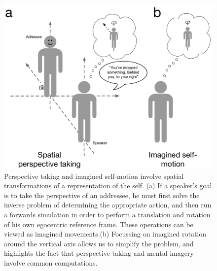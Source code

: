 \documentclass[english,floatsintext,man]{apa6}
\theoremstyle{definition}
\theoremstyle{definition}
\theoremstyle{remark}
\begin{document}
\begin{figure}
\centering
\includegraphics{diagrams/fig-1-common-process.pdf}
\caption{\label{fig:spt-schematic}Perspective taking and imagined
self-motion involve spatial transformations of a representation of the
self. (a) If a speaker's goal is to take the perspective of an
addressee, he must first solve the inverse problem of determining the
appropriate action, and then run a forwards simulation in order to
perform a translation and rotation of his own egocentric reference
frame. These operations can be viewed as imagined movements.(b)
Focussing on imagined rotation around the vertical axis allows us to
simplify the problem, and highlights the fact that perspective taking
and mental imagery involve common computations.}
\end{figure}
\end{document}
